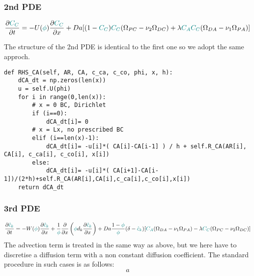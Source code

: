 \documentclass[a4paper]{article}
\begin{document}
\subsubsection*{2nd PDE}
\[
\frac{\partial {\color{teal}C_C}}{\partial t} 
= -U({\color{teal}\phi}) \frac{\partial {\color{teal}C_C}}{\partial x}  
+ Da[(1-{\color{teal}C_C}){\color{teal}C_C}(\Omega_{PC}-\nu_2\Omega_{DC})+
\lambda {\color{teal}C_AC_C} (\Omega_{DA}-\nu_1\Omega_{PA})]
\]

The structure of the 2nd PDE is identical to the first one so we adopt the same approch.
\begin{lstlisting}
def RHS_CA(self, AR, CA, c_ca, c_co, phi, x, h):
    dCA_dt = np.zeros(len(x))
    u = self.U(phi)
    for i in range(0,len(x)):
        # x = 0 BC, Dirichlet
        if (i==0):
            dCA_dt[i]= 0
        # x = Lx, no prescribed BC
        elif (i==len(x)-1):
            dCA_dt[i]= -u[i]*( CA[i]-CA[i-1] ) / h + self.R_CA(AR[i], CA[i], c_ca[i], c_co[i], x[i])
        else:
            dCA_dt[i]= -u[i]*( CA[i+1]-CA[i-1])/(2*h)+self.R_CA(AR[i],CA[i],c_ca[i],c_co[i],x[i])
    return dCA_dt
\end{lstlisting}

\subsubsection*{3rd PDE}

\[
\frac{\partial {\color{teal}\hat{c}_k}}{\partial t} 
= -W({\color{teal}\phi}) \frac{\partial {\color{teal}\hat{c}_k}}{\partial x}
+\frac{1}{\color{teal}\phi} \frac{\partial}{\partial x} 
\left( {\color{teal}\phi} d_k \frac{\partial {\color{teal}\hat{c}_k}}{\partial x} \right)
+Da \frac{1-{\color{teal}\phi}}{{\color{teal}\phi}}(\delta-{\color{teal}\hat{c}_k})
[{\color{teal}C_A}(\Omega_{DA}-\nu_1\Omega_{PA})-\lambda 
{\color{teal}C_C} (\Omega_{PC}-\nu_2 \Omega_{DC})  ]
\]
The advection term is treated in the same way as above, but we here have to discretise 
a diffusion term with a non constant diffusion coefficient.
The standard procedure in such cases is as follows:
\[
a
\] 
\end{document}
